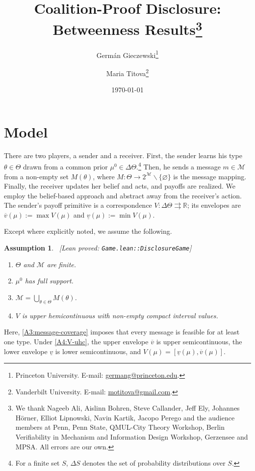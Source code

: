 \documentclass[11pt]{article}
\newtheorem{assumption}{Assumption}
\newcommand{\Msg}{\mathcal{M}}
\newcommand{\leanproved}[1]{{\footnotesize\textsf{\textcolor{green!55!black}{[Lean proved: \texttt{#1}]}}}}
\begin{document}
\title{Coalition-Proof Disclosure: Betweenness Results\thanks{We thank Nageeb Ali, Aislinn Bohren, Steve Callander, Jeff Ely, Johannes H\"orner, Elliot Lipnowski, Navin Kartik, Jacopo Perego and the audience members at Penn, Penn State, QMUL-City Theory Workshop, Berlin Verifiability in Mechanism and Information Design Workshop, Gerzensee and MPSA. All errors are our own.}}
\author{Germ\'an Gieczewski\thanks{Princeton University. E-mail: \href{mailto:germang@princeton.edu}{germang@princeton.edu}.} \and Maria Titova\thanks{Vanderbilt University. E-mail: \href{mailto:motitova@gmail.com}{motitova@gmail.com}.}}
\date{\today}
\maketitle

\section{Model}\label{sec:model}

There are two players, a sender and a receiver. First, the sender learns his type $\theta \in \Theta$ drawn from a common prior $\mu^0 \in \Delta \Theta$.\footnote{For a finite set $S$, $\Delta S$ denotes the set of probability distributions over $S$.} Then, he sends a message $m \in \Msg$ from a non-empty set $M(\theta)$, where $M: \Theta \to 2^{\Msg} \smallsetminus \{ \varnothing \}$ is the message mapping. Finally, the receiver updates her belief and acts, and payoffs are realized. We employ the belief-based approach and abstract away from the receiver's action. The sender's payoff primitive is a correspondence $V: \Delta \Theta \rightrightarrows \mathbb{R}$; its envelopes are $\overline{v}(\mu) := \max V(\mu)$ and $\underline{v}(\mu) := \min V(\mu)$.

Except where explicitly noted, we assume the following.
\begin{assumption}\label{assumption:game}\ \leanproved{Game.lean::DisclosureGame}
\begin{enumerate}[label=(A\arabic*), ref=(A\arabic*)]
    \item \label{A1:finite-sets} $\Theta$ and $\Msg$ are finite.
    \item \label{A2:full-support} $\mu^0$ has full support.
    \item \label{A3:message-coverage} $\Msg = \bigcup_{\theta \in \Theta} M(\theta)$.
    \item \label{A4:V-uhc} $V$ is upper hemicontinuous with non-empty compact interval values.
\end{enumerate}
\end{assumption}
Here, \cref{A3:message-coverage} imposes that every message is feasible for at least one type. Under \cref{A4:V-uhc}, the upper envelope $\overline{v}$ is upper semicontinuous, the lower envelope $\underline{v}$ is lower semicontinuous, and $V(\mu) = [\underline{v}(\mu), \overline{v}(\mu)]$.
\end{document}
